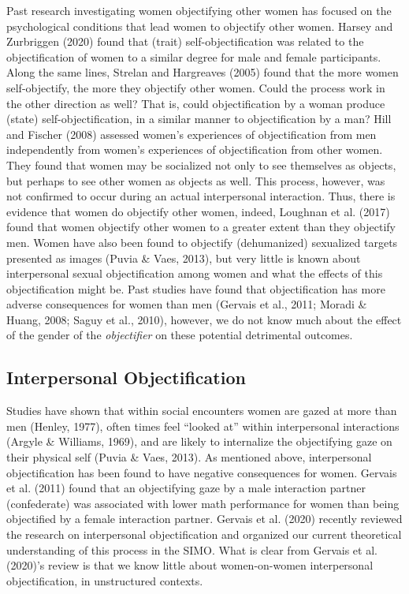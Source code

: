\documentclass[man]{apa6}
\begin{document}
Past research investigating women objectifying other women has focused
on the psychological conditions that lead women to objectify other
women. Harsey and Zurbriggen (2020) found that (trait)
self-objectification was related to the objectification of women to a
similar degree for male and female participants. Along the same lines,
Strelan and Hargreaves (2005) found that the more women self-objectify,
the more they objectify other women. Could the process work in the other
direction as well? That is, could objectification by a woman produce
(state) self-objectification, in a similar manner to objectification by
a man? Hill and Fischer (2008) assessed women's experiences of
objectification from men independently from women's experiences of
objectification from other women. They found that women may be
socialized not only to see themselves as objects, but perhaps to see
other women as objects as well. This process, however, was not confirmed
to occur during an actual interpersonal interaction. Thus, there is
evidence that women do objectify other women, indeed, Loughnan et al.
(2017) found that women objectify other women to a greater extent than
they objectify men. Women have also been found to objectify
(dehumanized) sexualized targets presented as images (Puvia \& Vaes,
2013), but very little is known about interpersonal sexual
objectification among women and what the effects of this objectification
might be. Past studies have found that objectification has more adverse
consequences for women than men (Gervais et al., 2011; Moradi \& Huang,
2008; Saguy et al., 2010), however, we do not know much about the effect
of the gender of the \emph{objectifier} on these potential detrimental
outcomes.

\subsection{Interpersonal
Objectification}\label{interpersonal-objectification}

Studies have shown that within social encounters women are gazed at more
than men (Henley, 1977), often times feel \enquote{looked at} within
interpersonal interactions (Argyle \& Williams, 1969), and are likely to
internalize the objectifying gaze on their physical self (Puvia \& Vaes,
2013). As mentioned above, interpersonal objectification has been found
to have negative consequences for women. Gervais et al. (2011) found
that an objectifying gaze by a male interaction partner (confederate)
was associated with lower math performance for women than being
objectified by a female interaction partner. Gervais et al. (2020)
recently reviewed the research on interpersonal objectification and
organized our current theoretical understanding of this process in the
SIMO. What is clear from Gervais et al. (2020)'s review is that we know
little about women-on-women interpersonal objectification, in
unstructured contexts.
\end{document}
